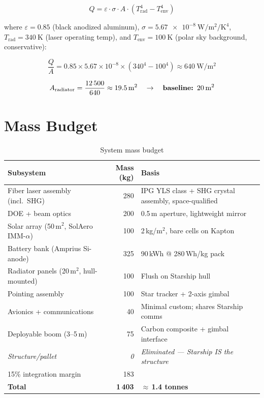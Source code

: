 \documentclass[10pt,letterpaper]{article}
\begin{document}
\[
  Q = \varepsilon \cdot \sigma \cdot A \cdot \left(T_{\text{rad}}^4
    - T_{\text{env}}^4\right)
\]

where $\varepsilon = 0.85$ (black anodized aluminum), $\sigma =
\SI{5.67e-8}{\watt\per\meter\squared\per\kelvin\tothe{4}}$, $T_{\text{rad}} =
\SI{340}{\kelvin}$ (laser operating temp), and $T_{\text{env}} =
\SI{100}{\kelvin}$ (polar sky background, conservative):

\[
  \frac{Q}{A} = 0.85 \times 5.67 \times 10^{-8}
                \times \left(340^4 - 100^4\right)
              \approx \SI{640}{\watt\per\meter\squared}
\]

\[
  A_{\text{radiator}} = \frac{12\,500}{640} \approx \SI{19.5}{\meter\squared}
    \quad \rightarrow \quad \textbf{baseline: \SI{20}{\meter\squared}}
\]

\section{Mass Budget}

\begin{table}[!ht]
\centering\small
\caption{System mass budget}
\label{tab:mass-budget}
\begin{tabular}{lrp{5.5cm}}
\toprule
\textbf{Subsystem} & \textbf{Mass (kg)} & \textbf{Basis} \\
\midrule
Fiber laser assembly (incl.\ SHG) & 280 & IPG YLS class + SHG crystal assembly, space-qualified \\
DOE + beam optics & 200 & 0.5\,m aperture, lightweight mirror \\
Solar array (50\,m$^2$, SolAero IMM-$\alpha$) & 100 & 2\,kg/m$^2$, bare cells on Kapton \\
Battery bank (Amprius Si-anode) & 325 & 90\,kWh @ 280\,Wh/kg pack \\
Radiator panels (20\,m$^2$, hull-mounted) & 100 & Flush on Starship hull \\
Pointing assembly & 100 & Star tracker + 2-axis gimbal \\
Avionics + communications & 40 & Minimal custom; shares Starship comms \\
Deployable boom (3--5\,m) & 75 & Carbon composite + gimbal interface \\
\textit{Structure/pallet} & \textit{0} & \textit{Eliminated --- Starship IS the structure} \\
15\% integration margin & 183 & \\
\midrule
\textbf{Total} & \textbf{1\,403} & \textbf{$\approx$\,1.4 tonnes} \\
\bottomrule
\end{tabular}
\end{table}
\end{document}
